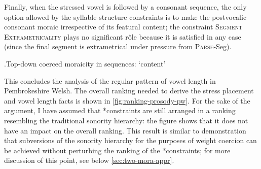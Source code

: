 Finally, when the stressed vowel is followed by a consonant sequence, the only option allowed by the syllable\hyp structure constraints is to make the postvocalic consonant moraic irrespective of its featural content; the constraint \textsc{Segment Extrametricality} plays no significant rôle because it is satisfied in any case (since the final segment is extrametrical under pressure from \textsc{Parse}-Seg).

\ex.Top-down coerced moraicity in sequences: \ipa{[ˈbalχ]} `content'\\
\begin{OTtableau}{5}
\end{OTtableau}

This concludes the analysis of the regular pattern of vowel length in Pembrokeshire Welsh. The overall ranking needed to derive the stress placement and vowel length facts is shown in \cref{fig:ranking-prosody-pw}. For the sake of the argument, I have assumed that *\mo[F] constraints are still arranged in a ranking resembling the traditional sonority hierarchy: the figure shows that it does not have an impact on the overall ranking. This result is similar to  demonstration that subversions of the sonority hierarchy for the purposes of weight coercion can be achieved without perturbing the ranking of the *\mo constraints; for more discussion of this point, see below \cref{sec:two-mora-appr}.

